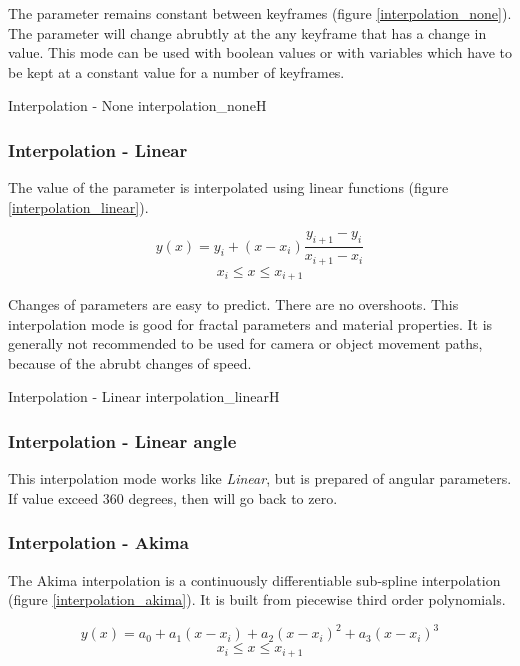 The parameter remains constant between keyframes (figure \ref{interpolation_none}). The parameter will change abrubtly at the any keyframe that has a change in value. This mode can be used with boolean values or with variables
which have to be kept at a constant value for a number of keyframes.

{Interpolation - None}
{interpolation_none}{H}

\subsubsection{Interpolation - Linear}\label{interpolation-linear}

The value of the parameter is interpolated using linear functions (figure \ref{interpolation_linear}).

\[ y(x) = y_i + (x - x_i) \frac{y_{i+1} - y_i}{x_{i+1} - x_i}\] \[x_i  \leq x
\leq x_{i+1}\]

Changes of parameters are easy to predict. There are no overshoots. This
interpolation mode is good for fractal parameters and material properties. It is
generally not recommended to be used for camera or object movement paths, because of the abrubt changes of speed.

{Interpolation - Linear}
{interpolation_linear}{H}

\subsubsection{Interpolation - Linear angle}\label{interpolation-linear-angle}

This interpolation mode works like \emph{Linear}, but is prepared of angular
parameters. If value exceed 360 degrees, then will go back to zero.

\subsubsection{Interpolation - Akima}\label{interpolation-akima}

The Akima interpolation is a continuously differentiable sub-spline
interpolation (figure \ref{interpolation_akima}). It is built from piecewise third order polynomials.

\[ y(x) = a_0 + a_1 (x - x_i) + a_2 (x - x_i)^2 + a_3 (x - x_i)^3\] \[x_i  \leq
x \leq x_{i+1}\]

